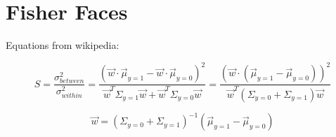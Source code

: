 \section{Fisher Faces}

Equations from wikipedia:

\begin{equation}
S=\frac{\sigma_{between}^2}{\sigma_{within}^2}= \frac{(\vec w \cdot \vec \mu_{y=1} - \vec w \cdot \vec \mu_{y=0})^2}{\vec w^T \Sigma_{y=1} \vec w + \vec w^T \Sigma_{y=0} \vec w} = \frac{(\vec w \cdot (\vec \mu_{y=1} - \vec \mu_{y=0}))^2}{\vec w^T (\Sigma_{y=0}+\Sigma_{y=1}) \vec w}
\end{equation}

\begin{equation}
\vec w = (\Sigma_{y=0}+\Sigma_{y=1})^{-1}(\vec \mu_{y=1} - \vec \mu_{y=0})
\end{equation}
